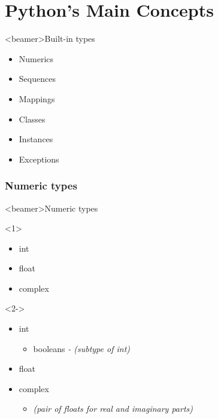 
\part{Python's Main Concepts}  %


\begin{frame}<beamer>{Built-in types}

  \begin{itemize}
    \item Numerics
    \item Sequences
    \item Mappings
    \item Classes
    \item Instances
    \item Exceptions
  \end{itemize}

\end{frame}


\section{Numeric types}

\begin{frame}<beamer>{Numeric types}

  \begin{onlyenv}<1>
    \begin{itemize}
      \item<1> int
      \item<1> float
      \item<1> complex
    \end{itemize}
  \end{onlyenv}

  \begin{onlyenv}<2->
    \begin{itemize}
      \item<2-> int
      \begin{itemize}
        \item<2-> booleans \textit{- (subtype of int)}
      \end{itemize}
      \item<2-> float
      \item<2-> complex
      \begin{itemize}
        \item<3-> \textit{(pair of floats for real and imaginary parts)}
      \end{itemize}
    \end{itemize}
  \end{onlyenv}

\end{frame}


